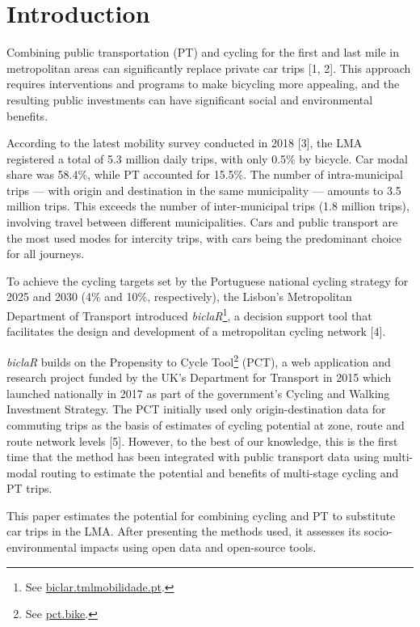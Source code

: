 \documentclass[runningheads]{llncs}
\begin{document}
\section{Introduction}\label{introduction}

Combining public transportation (PT) and cycling for the first and last
mile in metropolitan areas can significantly replace private car trips
{[}1, 2{]}. This approach requires interventions and programs to make
bicycling more appealing, and the resulting public investments can have
significant social and environmental benefits.

According to the latest mobility survey conducted in 2018 {[}3{]}, the
LMA registered a total of 5.3 million daily trips, with only 0.5\% by
bicycle. Car modal share was 58.4\%, while PT accounted for 15.5\%. The
number of intra-municipal trips --- with origin and destination in the
same municipality --- amounts to 3.5 million trips. This exceeds the
number of inter-municipal trips (1.8 million trips), involving travel
between different municipalities. Cars and public transport are the most
used modes for intercity trips, with cars being the predominant choice
for all journeys.

To achieve the cycling targets set by the Portuguese national cycling
strategy for 2025 and 2030 (4\% and 10\%, respectively), the Lisbon's
Metropolitan Department of Transport introduced
\emph{biclaR}\footnote{See
  \href{https://biclar.tmlmobilidade.pt/}{biclar.tmlmobilidade.pt}.}, a
decision support tool that facilitates the design and development of a
metropolitan cycling network {[}4{]}.

\emph{biclaR} builds on the Propensity to Cycle Tool\footnote{See
  \href{https://www.pct.bike/}{pct.bike}.} (PCT), a web application and
research project funded by the UK's Department for Transport in 2015
which launched nationally in 2017 as part of the government's Cycling
and Walking Investment Strategy. The PCT initially used only
origin-destination data for commuting trips as the basis of estimates of
cycling potential at zone, route and route network levels {[}5{]}.
However, to the best of our knowledge, this is the first time that the
method has been integrated with public transport data using multi-modal
routing to estimate the potential and benefits of multi-stage cycling
and PT trips.

This paper estimates the potential for combining cycling and PT to
substitute car trips in the LMA. After presenting the methods used, it
assesses its socio-environmental impacts using open data and open-source
tools.
\end{document}
